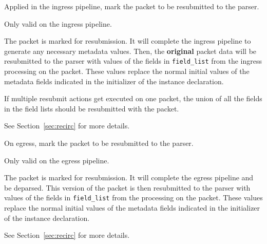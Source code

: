 \documentclass[12pt]{article}
\begin{document}
{%
Applied in the ingress pipeline, mark the packet to be resubmitted to the 
parser.
}
{ %
}
{ %
Only valid on the ingress pipeline.

The packet is marked for resubmission. It will complete the ingress pipeline 
to generate any necessary metadata values. Then, the \textbf{original} packet data 
will be resubmitted to the parser with values of the fields in \texttt{field_list} from 
the ingress processing on the packet. These values replace the normal initial 
values of the metadata fields indicated in the initializer of the instance 
declaration.

If multiple resubmit actions get executed on one packet, the union of all 
the fields in the field lists should be resubmitted with the packet.

See Section~\ref{sec:recirc} for more details.

}


{ %
On egress, mark the packet to be resubmitted to the parser.
}
{ %
}
{ %
Only valid on the egress pipeline.

The packet is marked for resubmission. It will complete the egress pipeline 
and be deparsed.  This version of the packet is then resubmitted to the parser 
with values of the fields in \texttt{field_list} from the processing on the packet. 
These values replace the normal initial values of the metadata fields indicated 
in the initializer of the instance declaration.

See Section~\ref{sec:recirc} for more details.

}

\end{document}
